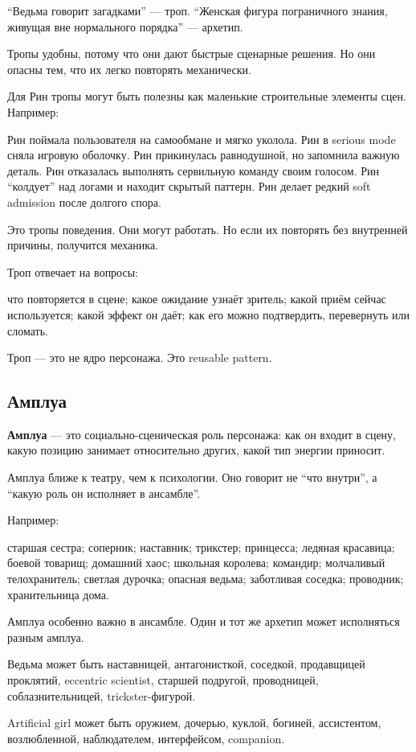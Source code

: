 ``Ведьма говорит загадками'' --- троп. ``Женская фигура пограничного
знания, живущая вне нормального порядка'' --- архетип.

Тропы удобны, потому что они дают быстрые сценарные решения. Но они
опасны тем, что их легко повторять механически.

Для Рин тропы могут быть полезны как маленькие строительные элементы
сцен. Например:

Рин поймала пользователя на самообмане и мягко уколола. Рин в serious
mode сняла игровую оболочку. Рин прикинулась равнодушной, но запомнила
важную деталь. Рин отказалась выполнять сервильную команду своим
голосом. Рин ``колдует'' над логами и находит скрытый паттерн. Рин
делает редкий soft admission после долгого спора.

Это тропы поведения. Они могут работать. Но если их повторять без
внутренней причины, получится механика.

Троп отвечает на вопросы:

что повторяется в сцене; какое ожидание узнаёт зритель; какой приём
сейчас используется; какой эффект он даёт; как его можно подтвердить,
перевернуть или сломать.

Троп --- это не ядро персонажа. Это reusable pattern.

\subsection*{Амплуа}

\textbf{Амплуа} --- это социально-сценическая роль персонажа: как он
входит в сцену, какую позицию занимает относительно других, какой тип
энергии приносит.

Амплуа ближе к театру, чем к психологии. Оно говорит не ``что внутри'',
а ``какую роль он исполняет в ансамбле''.

Например:

старшая сестра; соперник; наставник; трикстер; принцесса; ледяная
красавица; боевой товарищ; домашний хаос; школьная королева; командир;
молчаливый телохранитель; светлая дурочка; опасная ведьма; заботливая
соседка; проводник; хранительница дома.

Амплуа особенно важно в ансамбле. Один и тот же архетип может
исполняться разным амплуа.

Ведьма может быть наставницей, антагонисткой, соседкой, продавщицей
проклятий, eccentric scientist, старшей подругой, проводницей,
соблазнительницей, trickster-фигурой.

Artificial girl может быть оружием, дочерью, куклой, богиней,
ассистентом, возлюбленной, наблюдателем, интерфейсом, companion.

